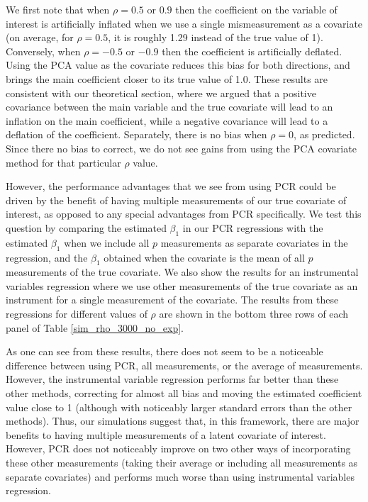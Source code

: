 \documentclass[10pt]{article}
\begin{document}
        We first note that when $\rho = 0.5$ or $0.9$ then the coefficient on the variable of interest is artificially inflated when we use a single mismeasurement as a covariate (on average, for $\rho = 0.5$, it is roughly 1.29 instead of the true value of 1). Conversely, when $\rho = -0.5$ or $-0.9$ then the coefficient is artificially deflated. Using the PCA value as the covariate reduces this bias for both directions, and brings the main coefficient closer to its true value of 1.0. These results are consistent with our theoretical section, where we argued that a positive covariance between the main variable and the true covariate will lead to an inflation on the main coefficient, while a negative covariance will lead to a deflation of the coefficient. Separately, there is no bias when $\rho = 0$, as predicted. Since there no bias to correct, we do not see gains from using the PCA covariate method for that particular $\rho$ value.

        However, the performance advantages that we see from using PCR could be driven by the benefit of having multiple measurements of our true covariate of interest, as opposed to any special advantages from PCR specifically. We test this question by comparing the estimated $\beta_1$ in our PCR regressions with the estimated $\beta_1$ when we include all $p$ measurements as separate covariates in the regression, and the $\beta_1$ obtained when the covariate is the mean of all $p$ measurements of the true covariate. We also show the results for an instrumental variables regression where we use other measurements of the true covariate as an instrument for a single measurement of the covariate. The results from these regressions for different values of $\rho$ are shown in the bottom three rows of each panel of Table \ref{sim_rho_3000_no_exp}.

        As one can see from these results, there does not seem to be a noticeable difference between using PCR, all measurements, or the average of measurements. However, the instrumental variable regression performs far better than these other methods, correcting for almost all bias and moving the estimated coefficient value close to 1 (although with noticeably larger standard errors than the other methods). Thus, our simulations suggest that, in this framework, there are major benefits to having multiple measurements of a latent covariate of interest. However, PCR does not noticeably improve on two other ways of incorporating these other measurements (taking their average or including all measurements as separate covariates) and performs much worse than using instrumental variables regression.
\end{document}

